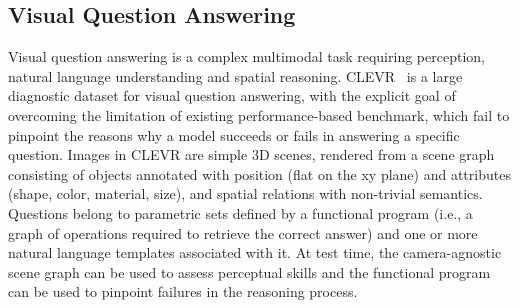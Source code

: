 \subsection{Visual Question Answering}
Visual question answering is a complex multimodal task requiring perception, natural language understanding and spatial reasoning. CLEVR~\cite{johnson2017clevr} is a large diagnostic dataset for visual question answering, with the explicit goal of overcoming the limitation of existing performance-based benchmark, which fail to pinpoint the reasons why a model succeeds or fails in answering a specific question.
Images in CLEVR are simple 3D scenes, rendered from a scene graph consisting of objects annotated with position (flat on the xy plane) and attributes (shape, color, material, size), and spatial relations with non-trivial semantics. %
Questions belong to parametric sets defined by a functional program (i.e., a graph of operations required to retrieve the correct answer) and one or more natural language templates associated with it.
At test time, the camera-agnostic scene graph can be used to assess perceptual skills and the functional program can be used to pinpoint failures in the reasoning process.

